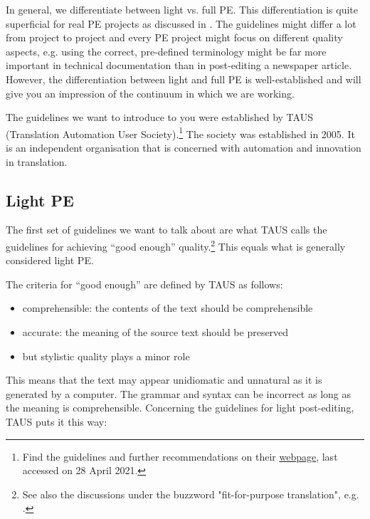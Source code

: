 In general, we differentiate between light vs. full PE. This differentiation is quite superficial for real PE projects as discussed in \citet{nunziatini2020machine}. The guidelines might differ a lot from project to project and every PE project might focus on different quality aspects, e.g. using the correct, pre-defined terminology might be far more important in technical documentation than in post-editing a newspaper article. However, the differentiation between light and full PE is well-established and will give you an impression of the continuum in which we are working.

The guidelines we want to introduce to you were established by TAUS (Translation Automation User Society).\footnote{Find the guidelines and further recommendations on their \href{https://www.taus.net/academy/best-practices/postedit-best-practices/machine-translation-post-editing-guidelines}{webpage}, last accessed on 28 April 2021.} The society was established in 2005. It is an independent organisation that is concerned with automation and innovation in translation. 

\subsection{Light PE}\label{sec:4:1:1}

The first set of guidelines we want to talk about are what TAUS calls the guidelines for achieving “good enough” quality.\footnote{See also the discussions under the buzzword "fit-for-purpose translation", e.g. \citet{bowker2019}.} This equals what is generally considered light PE.

The criteria for “good enough” are defined by TAUS as follows: 

\begin{itemize}
    \item comprehensible: the contents of the text should be comprehensible
    \item accurate: the meaning of the source text should be preserved
    \item but stylistic quality plays a minor role
\end{itemize} 

This means that the text may appear unidiomatic and unnatural as it is generated by a computer. The grammar and syntax can be incorrect as long as the meaning is comprehensible. Concerning the guidelines for light post-editing, TAUS puts it this way: 

